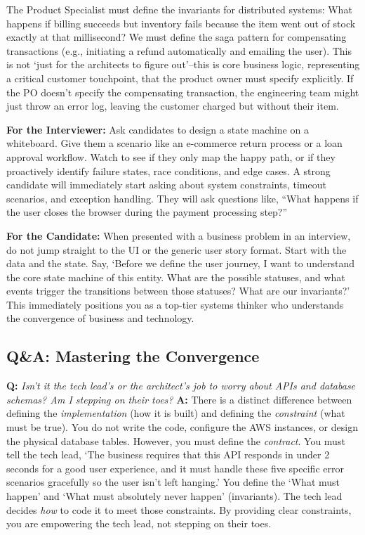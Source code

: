 \documentclass[
  11pt,
  openany,
  oneside]{book}
\renewenvironment{quote}{\begin{customquote}}{\end{customquote}}
\begin{document}
The Product Specialist must define the invariants for distributed
systems: What happens if billing succeeds but inventory fails because
the item went out of stock exactly at that millisecond? We must define
the saga pattern for compensating transactions (e.g., initiating a
refund automatically and emailing the user). This is not `just for the
architects to figure out'--this is core business logic, representing a
critical customer touchpoint, that the product owner must specify
explicitly. If the PO doesn't specify the compensating transaction, the
engineering team might just throw an error log, leaving the customer
charged but without their item.

\begin{quote}
\textbf{For the Interviewer:} Ask candidates to design a state machine
on a whiteboard. Give them a scenario like an e-commerce return process
or a loan approval workflow. Watch to see if they only map the happy
path, or if they proactively identify failure states, race conditions,
and edge cases. A strong candidate will immediately start asking about
system constraints, timeout scenarios, and exception handling. They will
ask questions like, ``What happens if the user closes the browser during
the payment processing step?''
\end{quote}

\begin{quote}
\textbf{For the Candidate:} When presented with a business problem in an
interview, do not jump straight to the UI or the generic user story
format. Start with the data and the state. Say, `Before we define the
user journey, I want to understand the core state machine of this
entity. What are the possible statuses, and what events trigger the
transitions between those statuses? What are our invariants?' This
immediately positions you as a top-tier systems thinker who understands
the convergence of business and technology.
\end{quote}

\subsection{Q\&A: Mastering the
Convergence}\label{qa-mastering-the-convergence}

\textbf{Q:} \emph{Isn't it the tech lead's or the architect's job to
worry about APIs and database schemas? Am I stepping on their toes?}
\textbf{A:} There is a distinct difference between defining the
\emph{implementation} (how it is built) and defining the
\emph{constraint} (what must be true). You do not write the code,
configure the AWS instances, or design the physical database tables.
However, you must define the \emph{contract}. You must tell the tech
lead, `The business requires that this API responds in under 2 seconds
for a good user experience, and it must handle these five specific error
scenarios gracefully so the user isn't left hanging.' You define the
`What must happen' and `What must absolutely never happen' (invariants).
The tech lead decides \emph{how} to code it to meet those constraints.
By providing clear constraints, you are empowering the tech lead, not
stepping on their toes.
\end{document}
